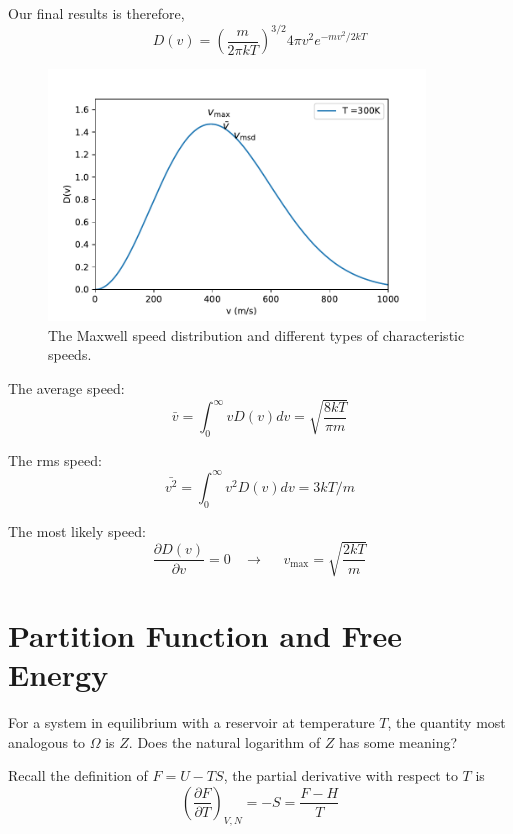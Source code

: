 Our final results is therefore,
\begin{equation}
D(v) = (\frac{m}{2\pi kT})^{3/2}4\pi v^2 e^{-mv^2/2kT}
\end{equation}

\begin{figure}[h]
\centering
\includegraphics[width=10cm]{imgs/Maxwell-speed.pdf}
\caption{The Maxwell speed distribution and different types of characteristic speeds. }
\end{figure}




The average speed:
\begin{equation}
\bar{v} = \int _0 ^{\infty} vD(v) dv = \sqrt{\frac{8kT}{\pi m}}
\end{equation}

The rms speed:
\begin{equation}
\bar{v^2} = \int_0^{\infty} v^2D(v) dv = 3kT/m
\end{equation}

The most likely speed:
\begin{equation}
\frac{\partial D(v)}{\partial v} = 0 ~~~~\rightarrow~~~~~~ v_\text{max}= \sqrt{\frac{2kT}{m}}
\end{equation}


\section{Partition Function and Free Energy}
For a system in equilibrium with a reservoir at temperature $T$, the quantity most analogous to $\Omega$
is $Z$. Does the natural logarithm of $Z$ has some meaning?

Recall the definition of $F = U - TS$, the partial derivative with respect to $T$ is
\begin{equation}
(\frac{\partial F}{\partial{T}})_{V,N} = -S = \frac{F-H}{T}
\end{equation}


